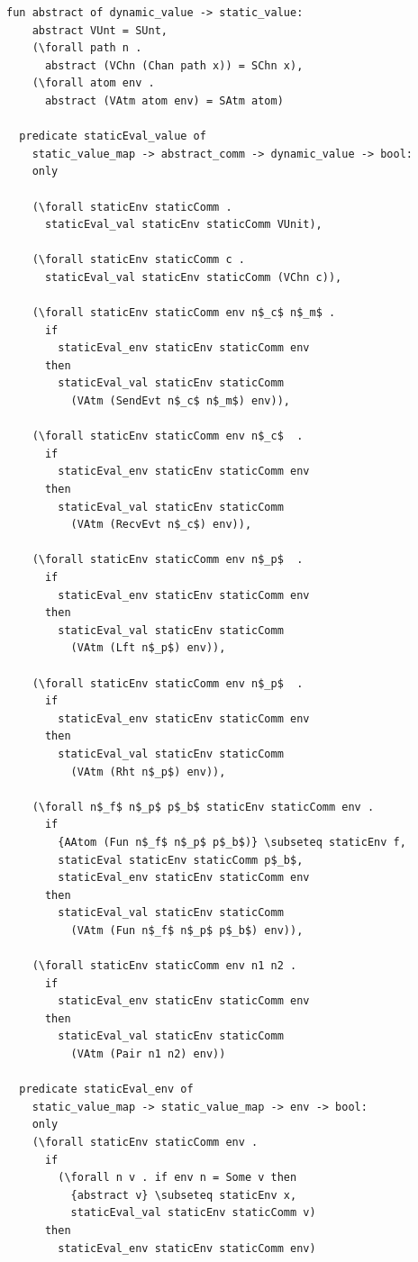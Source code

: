 \documentclass[10pt]{article}
\begin{document}
\begin{lstlisting}[language=logic, mathescape]
  fun abstract of dynamic_value -> static_value:
    abstract VUnt = SUnt, 
    (\forall path n . 
      abstract (VChn (Chan path x)) = SChn x),
    (\forall atom env .
      abstract (VAtm atom env) = SAtm atom)

  predicate staticEval_value of
    static_value_map -> abstract_comm -> dynamic_value -> bool: 
    only

    (\forall staticEnv staticComm .
      staticEval_val staticEnv staticComm VUnit),

    (\forall staticEnv staticComm c .
      staticEval_val staticEnv staticComm (VChn c)),

    (\forall staticEnv staticComm env n$_c$ n$_m$ .
      if
        staticEval_env staticEnv staticComm env
      then
        staticEval_val staticEnv staticComm
          (VAtm (SendEvt n$_c$ n$_m$) env)),

    (\forall staticEnv staticComm env n$_c$  .
      if
        staticEval_env staticEnv staticComm env
      then
        staticEval_val staticEnv staticComm
          (VAtm (RecvEvt n$_c$) env)),

    (\forall staticEnv staticComm env n$_p$  .
      if
        staticEval_env staticEnv staticComm env
      then
        staticEval_val staticEnv staticComm
          (VAtm (Lft n$_p$) env)),
        
    (\forall staticEnv staticComm env n$_p$  .
      if
        staticEval_env staticEnv staticComm env
      then
        staticEval_val staticEnv staticComm
          (VAtm (Rht n$_p$) env)),

    (\forall n$_f$ n$_p$ p$_b$ staticEnv staticComm env .
      if
        {AAtom (Fun n$_f$ n$_p$ p$_b$)} \subseteq staticEnv f, 
        staticEval staticEnv staticComm p$_b$, 
        staticEval_env staticEnv staticComm env
      then
        staticEval_val staticEnv staticComm
          (VAtm (Fun n$_f$ n$_p$ p$_b$) env)),

    (\forall staticEnv staticComm env n1 n2 .
      if
        staticEval_env staticEnv staticComm env
      then
        staticEval_val staticEnv staticComm
          (VAtm (Pair n1 n2) env))

  predicate staticEval_env of
    static_value_map -> static_value_map -> env -> bool:
    only 
    (\forall staticEnv staticComm env .
      if
        (\forall n v . if env n = Some v then
          {abstract v} \subseteq staticEnv x,
          staticEval_val staticEnv staticComm v)
      then 
        staticEval_env staticEnv staticComm env)


\end{lstlisting}
\end{document}
